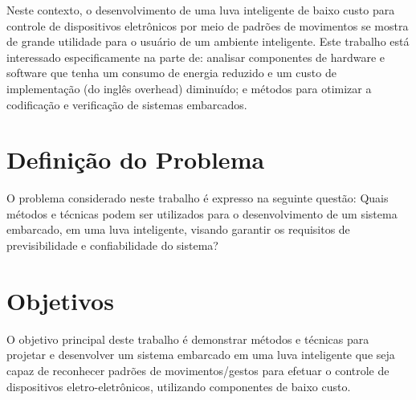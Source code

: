 Neste contexto, o desenvolvimento de uma luva inteligente de baixo custo para controle de dispositivos eletrônicos por meio de padrões de movimentos se mostra de grande utilidade para o usuário de um ambiente inteligente. Este trabalho está interessado especificamente na parte de: analisar componentes de hardware e software que tenha um consumo de energia reduzido e um custo de implementação (do inglês overhead) diminuído; e métodos para otimizar a codificação e verificação de sistemas embarcados.


\section{Definição do Problema}

O problema considerado neste trabalho é expresso na seguinte questão: Quais métodos e técnicas podem ser utilizados para o desenvolvimento de um sistema embarcado, em uma luva inteligente, visando garantir os requisitos de previsibilidade e confiabilidade do sistema?


\section{Objetivos}

O objetivo principal deste trabalho é demonstrar métodos e técnicas para projetar e desenvolver um sistema embarcado em uma luva inteligente que seja capaz de reconhecer padrões de movimentos/gestos para efetuar o controle de dispositivos eletro-eletrônicos, utilizando componentes de baixo custo. 


